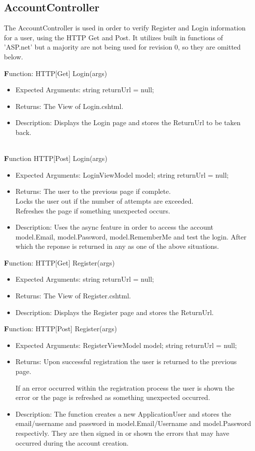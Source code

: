 \documentclass{scrreprt}
\begin{document}
\subsection{AccountController}
The AccountController is used in order to verify Register and Login information for a user, using the HTTP Get and Post. It utilizes built in functions of 'ASP.net' but a majority are not being used for revision 0, so they are omitted below.

  \textbf Function:  HTTP[Get] Login(args)
  \begin{itemize}
    \item Expected Arguments:
    string returnUrl = null;
    \item Returns:
    The View of Login.cshtml.
    \item Description:
    Displays the Login page and stores the ReturnUrl to be taken back.
  \end{itemize}
  \\
  \textbf Function HTTP[Post] Login(args)
  \begin{itemize}
    \item Expected Arguments:
    LoginViewModel model;
    string returnUrl = null;
    \item Returns:
    The user to the previous page if complete.
    \\
    Locks the user out if the number of attempts are exceeded.
    \\
    Refreshes the page if something unexpected occurs.
    \item Description:
    Uses the async feature in order to access the account model.Email, model.Password, model.RememberMe and test the login. After which the reponse is returned in any as one of the above situations.
  \end{itemize}

  \textbf Function: HTTP[Get] Register(args)
  \begin{itemize}
    \item Expected Arguments:
    string returnUrl = null;
    \item Returns:
    The View of Register.cshtml.
    \item Description:
    Displays the Register page and stores the ReturnUrl.
  \end{itemize}

  \textbf Function: HTTP[Post] Register(args)
  \begin{itemize}
    \item Expected Arguments:
    RegisterViewModel model;
    string returnUrl = null;
    \item Returns:
    Upon successful registration the user is returned to the previous page.

    If an error occurred within the registration process the user is shown the error or the page is refreshed as something unexpected occurred.
    \item Description:
    The function creates a new ApplicationUser and stores the email/username and password in model.Email/Username and model.Password respectivly. They are then signed in or shown the errors that may have occurred during the account creation.
  \end{itemize}
\end{document}
